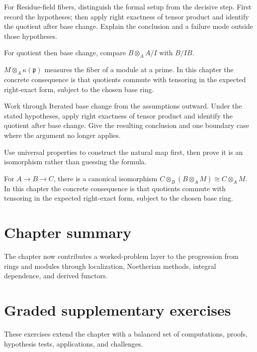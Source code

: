 \begin{exercise}\label{exr:v11-07}
For Residue-field fibers, distinguish the formal setup from the decisive step. First record the hypotheses; then apply right exactness of tensor product and identify the quotient after base change. Explain the conclusion and a failure mode outside those hypotheses.
\end{exercise}
\begin{hint}
For quotient then base change, compare \(B\otimes_A A/I\) with \(B/IB\).
\end{hint}
\begin{solution}
$M\otimes_A\kappa(\mathfrak p)$ measures the fiber of a module at a prime. In this chapter the concrete consequence is that quotients commute with tensoring in the expected right-exact form, subject to the chosen base ring.
\end{solution}

\begin{exercise}\label{exr:v11-08}
Work through Iterated base change from the assumptions outward. Under the stated hypotheses, apply right exactness of tensor product and identify the quotient after base change. Give the resulting conclusion and one boundary case where the argument no longer applies.
\end{exercise}
\begin{hint}
Use universal properties to construct the natural map first, then prove it is an isomorphism rather than guessing the formula.
\end{hint}
\begin{solution}
For $A\to B\to C$, there is a canonical isomorphism $C\otimes_B(B\otimes_A M)\cong C\otimes_A M$. In this chapter the concrete consequence is that quotients commute with tensoring in the expected right-exact form, subject to the chosen base ring.
\end{solution}

\section*{Chapter summary}
The chapter now contributes a worked-problem layer to the progression from rings and modules through localization, Noetherian methods, integral dependence, and derived functors.
\section{Graded supplementary exercises}
These exercises extend the chapter with a balanced set of computations, proofs, hypothesis tests, applications, and challenges.

